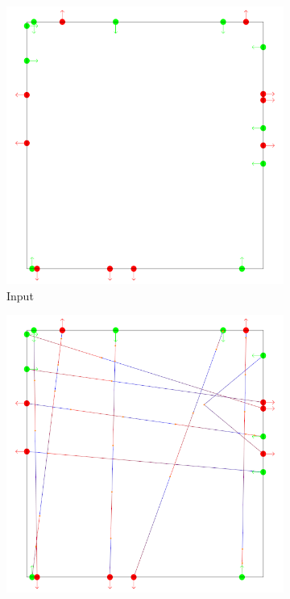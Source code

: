 \begin{figure}[t]
 \centering
 \begin{subfigure}[b]{0.24\linewidth}
 	\includegraphics[width=\linewidth]{images/steps-input.png}
 	\caption{Input}
 \end{subfigure}
 \begin{subfigure}[b]{0.24\linewidth}
 	\includegraphics[width=\linewidth]{images/steps-connected.png}

\end{subfigure}
\end{figure}
